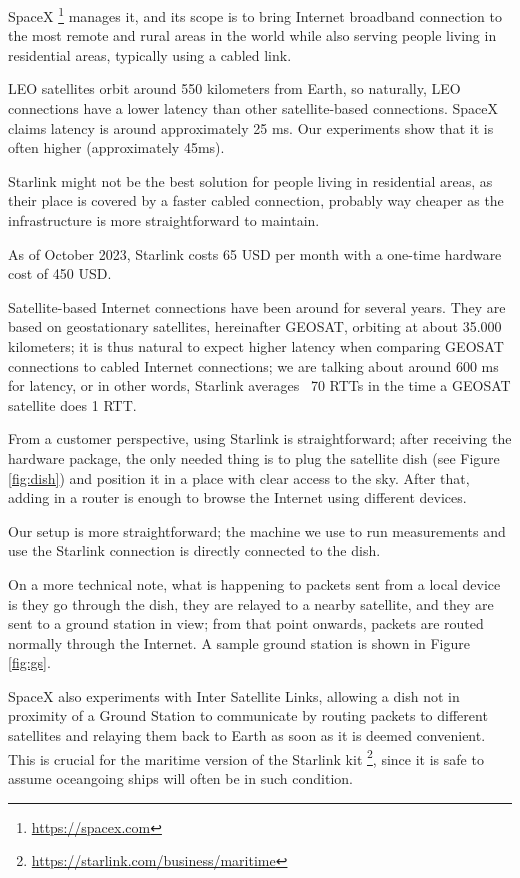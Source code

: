 \documentclass[IN,11pt,twoside,openright,idp,english]{tumthesis}
\begin{document}
SpaceX \footnote{\url{https://spacex.com}} manages it, and its scope is to bring Internet broadband connection to the most remote and rural areas in the world while also serving people living in residential areas, typically using a cabled link.
    
LEO satellites orbit around 550 kilometers from Earth, so naturally, LEO connections have a lower latency than other satellite-based connections. SpaceX claims latency is around approximately 25 ms. Our experiments show that it is often higher (approximately 45ms). 
    
Starlink might not be the best solution for people living in residential areas, as their place is covered by a faster cabled connection, probably way cheaper as the infrastructure is more straightforward to maintain. 
    
As of October 2023, Starlink costs 65 USD per month with a one-time hardware cost of 450 USD. 
    
Satellite-based Internet connections have been around for several years. They are based on geostationary satellites, hereinafter GEOSAT, orbiting at about 35.000 kilometers; it is thus natural to expect higher latency when comparing GEOSAT connections to cabled Internet connections; we are talking about around 600 ms for latency, or in other words, Starlink averages ~70 RTTs in the time a GEOSAT satellite does 1 RTT.
    
From a customer perspective, using Starlink is straightforward; after receiving the hardware package, the only needed thing is to plug the satellite dish (see Figure \ref{fig:dish}) and position it in a place with clear access to the sky. After that, adding in a router is enough to browse the Internet using different devices. 

Our setup is more straightforward; the machine we use to run measurements and use the Starlink connection is directly connected to the dish.
    
On a more technical note, what is happening to packets sent from a local device is they go through the dish, they are relayed to a nearby satellite, and they are sent to a ground station in view; from that point onwards, packets are routed normally through the Internet. A sample ground station is shown in Figure \ref{fig:gs}.
    
SpaceX also experiments with Inter Satellite Links, allowing a dish not in proximity of a Ground Station to communicate by routing packets to different satellites and relaying them back to Earth as soon as it is deemed convenient. This is crucial for the maritime version of the Starlink kit \footnote{\url{https://starlink.com/business/maritime}}, since it is safe to assume oceangoing ships will often be in such condition.
\end{document}
